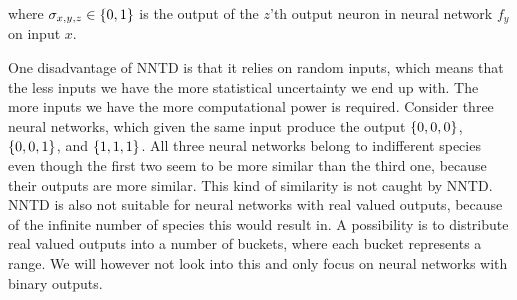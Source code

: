 where $\sigma_{x,y,z} \in \{ 0, 1 \}$ is the output of the $z$'th output neuron in neural network $f_y$ on input $x$.

One disadvantage of NNTD is that it relies on random inputs, which means that the less inputs we have the more statistical uncertainty we end up with. The more inputs we have the more computational power is required. Consider three neural networks, which given the same input produce the output $\{ 0, 0, 0 \}$, $\{ 0, 0, 1 \}$, and $\{ 1, 1, 1 \}$. All three neural networks belong to indifferent species even though the first two seem to be more similar than the third one, because their outputs are more similar. This kind of similarity is not caught by NNTD\@. NNTD is also not suitable for neural networks with real valued outputs, because of the infinite number of species this would result in. A possibility is to distribute real valued outputs into a number of buckets, where each bucket represents a range. We will however not look into this and only focus on neural networks with binary outputs.
